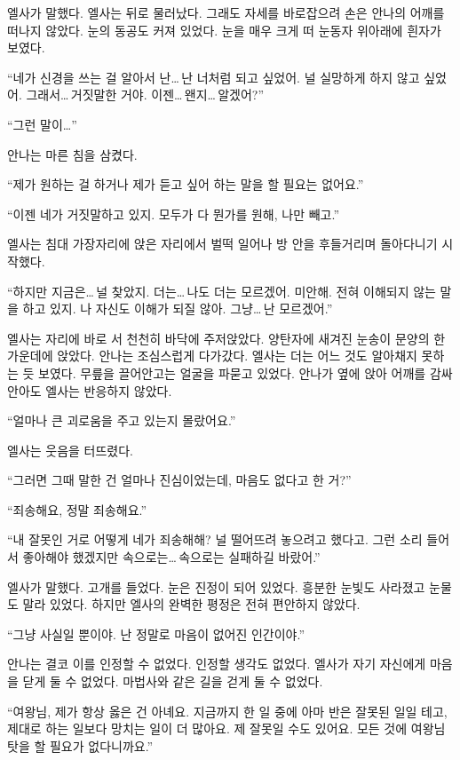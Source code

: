 엘사가 말했다. 엘사는 뒤로 물러났다. 그래도 자세를 바로잡으려 손은 안나의 어깨를 떠나지 않았다. 눈의 동공도 커져 있었다. 눈을 매우 크게 떠 눈동자 위아래에 흰자가 보였다.

``네가 신경을 쓰는 걸 알아서 난\ldots\,난 너처럼 되고 싶었어. 널 실망하게 하지 않고 싶었어. 그래서\ldots\,거짓말한 거야. 이젠\ldots\,왠지\ldots\,알겠어?''

``그런 말이\ldots''

안나는 마른 침을 삼켰다.

``제가 원하는 걸 하거나 제가 듣고 싶어 하는 말을 할 필요는 없어요.''

``이젠 네가 거짓말하고 있지. 모두가 다 뭔가를 원해, 나만 빼고.''

엘사는 침대 가장자리에 앉은 자리에서 벌떡 일어나 방 안을 후들거리며 돌아다니기 시작했다.

``하지만 지금은\ldots\,널 찾았지. 더는\ldots\,나도 더는 모르겠어. 미안해. 전혀 이해되지 않는 말을 하고 있지. 나 자신도 이해가 되질 않아. 그냥\ldots\,난 모르겠어.''

엘사는 자리에 바로 서 천천히 바닥에 주저앉았다. 양탄자에 새겨진 눈송이 문양의 한가운데에 앉았다. 안나는 조심스럽게 다가갔다. 엘사는 더는 어느 것도 알아채지 못하는 듯 보였다. 무릎을 끌어안고는 얼굴을 파묻고 있었다. 안나가 옆에 앉아 어깨를 감싸 안아도 엘사는 반응하지 않았다.

``얼마나 큰 괴로움을 주고 있는지 몰랐어요.''

엘사는 웃음을 터뜨렸다.

``그러면 그때 말한 건 얼마나 진심이었는데, 마음도 없다고 한 거?''

``죄송해요, 정말 죄송해요.''

``내 잘못인 거로 어떻게 네가 죄송해해? 널 떨어뜨려 놓으려고 했다고. 그런 소리 들어서 좋아해야 했겠지만 속으로는\ldots\,속으로는 실패하길 바랐어.''

엘사가 말했다. 고개를 들었다. 눈은 진정이 되어 있었다. 흥분한 눈빛도 사라졌고 눈물도 말라 있었다. 하지만 엘사의 완벽한 평정은 전혀 편안하지 않았다.

``그냥 사실일 뿐이야. 난 정말로 마음이 없어진 인간이야.''

안나는 결코 이를 인정할 수 없었다. 인정할 생각도 없었다. 엘사가 자기 자신에게 마음을 닫게 둘 수 없었다. 마법사와 같은 길을 걷게 둘 수 없었다.

``여왕님, 제가 항상 옳은 건 아녜요. 지금까지 한 일 중에 아마 반은 잘못된 일일 테고, 제대로 하는 일보다 망치는 일이 더 많아요. 제 잘못일 수도 있어요. 모든 것에 여왕님 탓을 할 필요가 없다니까요.''

